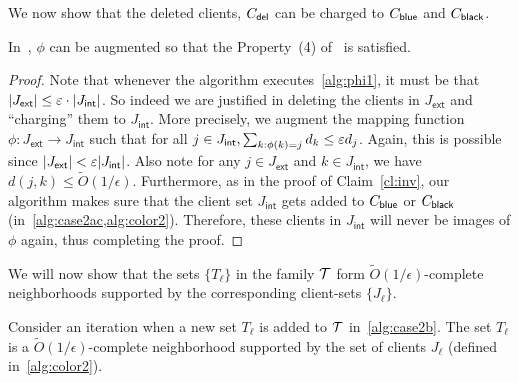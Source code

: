 We now show that the deleted clients, $C_{\mathsf{del}}$ can be charged to $C_{\mathsf{blue}}$ and $C_{\mathsf{black}}$.
\begin{claim} \label{cl:phi-augment}
In~, $\phi$ can be augmented so that the Property~(4) of~ is satisfied.
\end{claim}
\begin{proof}
Note that whenever the algorithm executes~\cref{alg:phi1}, it must be that $|J_\mathsf{ext}| \leq \varepsilon\cdot |J_\mathsf{int}|$. So indeed we are justified in deleting the clients in $J_\mathsf{ext}$ and ``charging'' them to $J_\mathsf{int}$. More precisely, we augment the
mapping function $\phi:J_\mathsf{ext} \to J_\mathsf{int}$ such that for all $j\in J_\mathsf{int}, \sum_{k:\phi(k) = j} d_k \leq \varepsilon d_j$. Again, this is possible since $|J_\mathsf{ext}| < \varepsilon|J_\mathsf{int}|$. Also note for any $j\in J_\mathsf{ext}$ and $k\in J_\mathsf{int}$,
we have $d(j,k) \leq \tilde{O}(1/\epsilon)$.
Furthermore, as in the proof of Claim~\ref{cl:inv}, our algorithm makes sure that the client set $J_\mathsf{int}$ gets added to $C_{\mathsf{blue}}$ or $C_{\mathsf{black}}$ (in~\cref{alg:case2ac,alg:color2}).
Therefore, these clients in $J_\mathsf{int}$ will never be images of $\phi$ again, thus completing the proof.
\end{proof}


We will now show that the sets $\{T_\ell\}$ in the family ${\cal T}$ form $\tilde{O}(1/\epsilon)$-complete neighborhoods supported by the corresponding client-sets $\{J_\ell\}$.
\begin{lemma} \label{lem:local}
Consider an iteration when a new set $T_\ell$ is added to ${\cal T}$ in~\cref{alg:case2b}. The set $T_\ell$ is a $\tilde{O}(1/\epsilon)$-complete neighborhood supported by the set of clients $J_\ell$ (defined in~\cref{alg:color2}).
\end{lemma}

